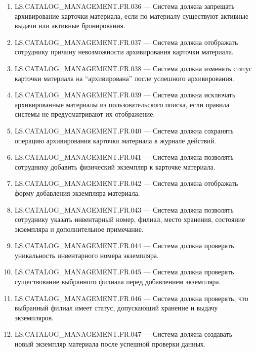 \documentclass[12pt,a4paper]{article}
\begin{document}
\begin{enumerate}
		\item LS.CATALOG\_MANAGEMENT.FR.036 --- Система должна запрещать архивирование
		карточки материала, если по материалу существуют активные выдачи или активные
		бронирования.
		
		\item LS.CATALOG\_MANAGEMENT.FR.037 --- Система должна отображать сотруднику
		причину невозможности архивирования карточки материала.
		
		\item LS.CATALOG\_MANAGEMENT.FR.038 --- Система должна изменять статус карточки
		материала на ``архивирована'' после успешного архивирования.
		
		\item LS.CATALOG\_MANAGEMENT.FR.039 --- Система должна исключать архивированные
		материалы из пользовательского поиска, если правила системы не предусматривают
		их отображение.
		
		\item LS.CATALOG\_MANAGEMENT.FR.040 --- Система должна сохранять операцию
		архивирования карточки материала в журнале действий.
		
		\item LS.CATALOG\_MANAGEMENT.FR.041 --- Система должна позволять сотруднику
		добавить физический экземпляр к карточке материала.
		
		\item LS.CATALOG\_MANAGEMENT.FR.042 --- Система должна отображать форму добавления
		экземпляра материала.
		
		\item LS.CATALOG\_MANAGEMENT.FR.043 --- Система должна позволять сотруднику
		указать инвентарный номер, филиал, место хранения, состояние экземпляра и
		дополнительное примечание.
		
		\item LS.CATALOG\_MANAGEMENT.FR.044 --- Система должна проверять уникальность
		инвентарного номера экземпляра.
		
		\item LS.CATALOG\_MANAGEMENT.FR.045 --- Система должна проверять существование
		выбранного филиала перед добавлением экземпляра.
		
		\item LS.CATALOG\_MANAGEMENT.FR.046 --- Система должна проверять, что выбранный
		филиал имеет статус, допускающий хранение и выдачу экземпляров.
		
		\item LS.CATALOG\_MANAGEMENT.FR.047 --- Система должна создавать новый экземпляр
		материала после успешной проверки данных.
		

\end{enumerate}
\end{document}
